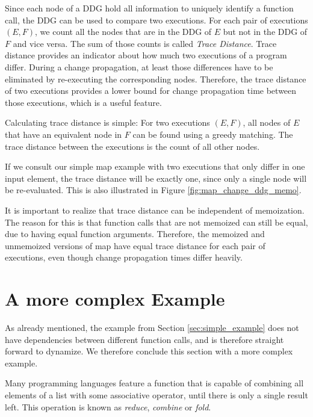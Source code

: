 Since each node of a DDG hold all information to uniquely identify a function call, the DDG can be used to compare two executions. For each pair of executions $(E, F)$, we count all the nodes that are in the DDG of $E$ but not in the DDG of $F$ and vice versa. The sum of those counts is called \textit{Trace Distance}. Trace distance provides an indicator about how much two executions of a program differ. During a change propagation, at least those differences have to be eliminated by re-executing the corresponding nodes. Therefore, the trace distance of two executions provides a lower bound for change propagation time between those executions, which is a useful feature. 

Calculating trace distance is simple: For two executions $(E, F)$, all nodes of $E$ that have an equivalent node in $F$ can be found using a greedy matching. The trace distance between the executions is the count of all other nodes. 

If we consult our simple map example with two executions that only differ in one input element, the trace distance will be exactly one, since only a single node will be re-evaluated. This is also illustrated in Figure \ref{fig:map_change_ddg_memo}.

It is important to realize that trace distance can be independent of memoization. The reason for this is that function calls that are not memoized can still be equal, due to having equal function arguments. Therefore, the memoized and unmemoized versions of map have equal trace distance for each pair of executions, even though change propagation times differ heavily.    



\section{A more complex Example}

As already mentioned, the example from Section \ref{sec:simple_example} does not have dependencies between different function calls, and is therefore straight forward to dynamize. We therefore conclude this section with a more complex example. 

Many programming languages feature a function that is capable of combining all elements of a list with some associative operator, until there is only a single result left. This operation is known as \textit{reduce}, \textit{combine} or \textit{fold}.  

